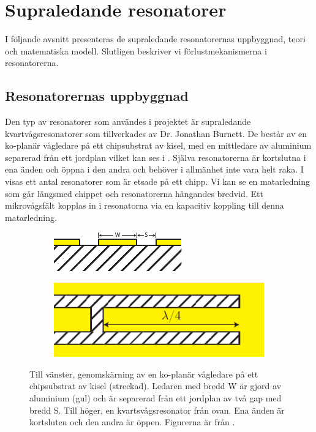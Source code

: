 \documentclass[main.tex]{subfiles}
\begin{document}
\chapter{Supraledande resonatorer}
I följande avsnitt presenteras de supraledande resonatorernas uppbyggnad, teori och matematiska modell. Slutligen beskriver vi förlustmekanismerna i resonatorerna.

\section{Resonatorernas uppbyggnad}

Den typ av resonatorer som användes i projektet är supraledande kvartvågsresonatorer som tillverkades av Dr. Jonathan Burnett. De består av en ko-planär vågledare på ett chipsubstrat av kisel, med en mittledare av aluminium separerad från ett jordplan \cite{Boehme2016} vilket kan ses i . Själva resonatorerna är kortslutna i ena änden och öppna i den andra och behöver i allmänhet inte vara helt raka. I  visas ett antal resonatorer som är etsade på ett chipp. Vi kan se en matarledning som går längsmed chippet och resonatorerna hängandes bredvid. Ett mikrovågsfält kopplas in i resonatorna via en kapacitiv koppling till denna matarledning.

\begin{figure}[H]
\centering
\begin{subfigure}{0.45\textwidth}
  \centering
  \includegraphics[width=0.8\linewidth]{figure/chipsubstrat.pdf}
\end{subfigure}%
\begin{subfigure}{.45\textwidth}
  \centering
  \includegraphics[width=0.8\linewidth]{figure/chipsubstrat2.pdf}
\end{subfigure}
\caption{Till vänster, genomskärning av en ko-planär vågledare på ett chipsubstrat av kisel (streckad). Ledaren med bredd W är gjord av aluminium (gul) och är separerad från ett jordplan av två gap med bredd S. Till höger, en kvartsvågsresonator från ovan. Ena änden är kortsluten och den andra är öppen. Figurerna är från \cite[fig. 2.1]{Boehme2016}.}
\label{fig:chipsubstrat}
\end{figure}
\end{document}
